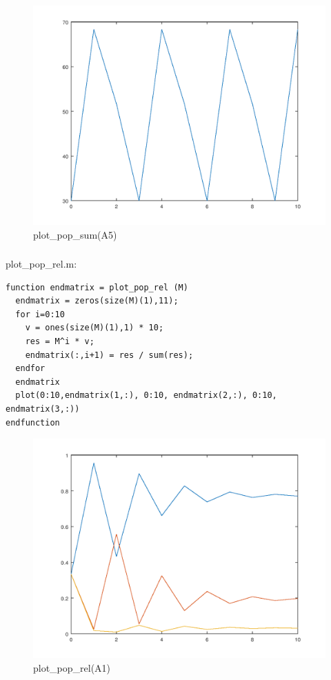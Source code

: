\documentclass{article}
\begin{document}
\begin{figure}[H]
\centering
\includegraphics[scale=0.5]{plotA5.png}
\caption{plot\_pop\_sum(A5)}
\label{fig:universe}
\end{figure}

\subsubsection{}
plot\_pop\_rel.m:
\begin{lstlisting}
function endmatrix = plot_pop_rel (M)
  endmatrix = zeros(size(M)(1),11);
  for i=0:10
    v = ones(size(M)(1),1) * 10;
    res = M^i * v;
    endmatrix(:,i+1) = res / sum(res);
  endfor
  endmatrix
  plot(0:10,endmatrix(1,:), 0:10, endmatrix(2,:), 0:10, endmatrix(3,:))
endfunction
\end{lstlisting}

\begin{figure}[H]
\centering
\includegraphics[scale=0.5]{plotrelA1.png}
\caption{plot\_pop\_rel(A1)}
\label{fig:universe}
\end{figure}
\end{document}
